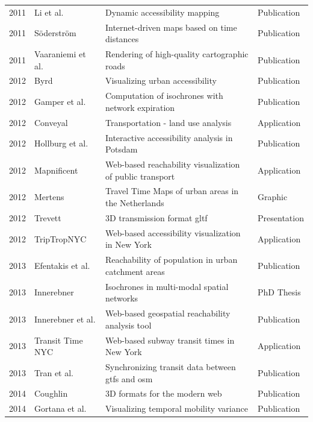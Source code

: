 \begin{table}[htp]
\begin{tabular}{r|l|l|l}
      2011 & Li et al. \cite{li2011dynamic} & Dynamic accessibility mapping & Publication \\
      2011 & Söderström \cite{soderstrom2011personal} & Internet-driven maps based on time distances & Publication \\
      2011 & Vaaraniemi et al. \cite{Vaaraniemi2011} & Rendering of high-quality cartographic roads & Publication \\
      2012 & Byrd \cite{Byrd2012} & Visualizing urban accessibility & Publication \\
      2012 & Gamper et al. \cite{gamper2012scalable} & Computation of isochrones with network expiration & Publication \\
      2012 & Conveyal \cite{Conveyal} & Transportation - land use analysis & Application \\
      2012 & Hollburg et al. \cite{hollburghier} & Interactive accessibility analysis in Potsdam & Publication \\
      2012 & Mapnificent \cite{Mapnificent} & Web-based reachability visualization of public transport & Application \\
      2012 & Mertens \cite{meertens2012} & Travel Time Maps of urban areas in the Netherlands & Graphic \\
      2012 & Trevett \cite{Trevett2012} & 3D transmission format \acrshort{gltf} & Presentation \\
      2012 & TripTropNYC \cite{TriptropNYC} & Web-based accessibility visualization in New York & Application \\
      2013 & Efentakis et al. \cite{efentakis2013isochrones} & Reachability of population in urban catchment areas & Publication \\
      2013 & Innerebner \cite{Innerebner2013} & Isochrones in multi-modal spatial networks & PhD Thesis \\
      2013 & Innerebner et al. \cite{innerebner2013isoga} & Web-based geospatial reachability analysis tool & Publication \\
      2013 & Transit Time NYC \cite{TransitTimeNYC} & Web-based subway transit times in New York & Application \\
      2013 & Tran et al. \cite{tran2013go_sync} & Synchronizing transit data between \acrshort{gtfs} and \acrshort{osm} & Publication \\
      2014 & Coughlin \cite{Coughlin2014} & 3D formats for the modern web & Publication \\
      2014 & Gortana et al. \cite{gortanaisoscope} & Visualizing temporal mobility variance & Publication \\

\end{tabular}
\end{table}
